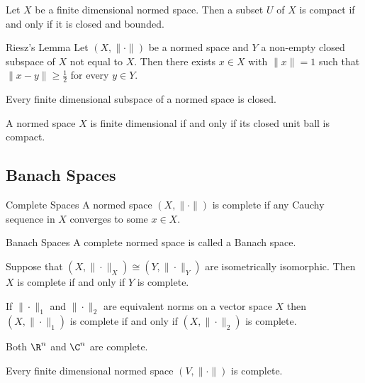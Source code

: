 \documentclass[a4paper]{article}
\begin{document}
\begin{thm}{}{} Let $X$ be a finite dimensional normed space. Then a subset $U$ of $X$ is compact if and only if it is closed and bounded. 
\end{thm}

\begin{lmm}{Riesz's Lemma}{} Let $(X,\|\cdot\|)$ be a normed space and $Y$ a non-empty closed subspace of $X$ not equal to $X$. Then there exists $x\in X$ with $\|x\|=1$ such that $\|x-y\|\geq \frac{1}{2}$ for every $y\in Y$. 
\end{lmm}

\begin{prp}{}{} Every finite dimensional subspace of a normed space is closed. 
\end{prp}

\begin{thm}{}{} A normed space $X$ is finite dimensional if and only if its closed unit ball is compact. 
\end{thm}

\subsection{Banach Spaces}
\begin{defn}{Complete Spaces}{} A normed space $(X,\|\cdot\|)$ is complete if any Cauchy sequence in $X$ converges to some $x\in X$. 
\end{defn}

\begin{defn}{Banach Spaces}{} A complete normed space is called a Banach space.
\end{defn}

\begin{lmm}{}{} Suppose that $(X,\|\cdot\|_X)\cong(Y,\|\cdot\|_Y)$ are isometrically isomorphic. Then $X$ is complete if and only if $Y$ is complete. 
\end{lmm}

\begin{lmm}{}{} If $\|\cdot\|_1$ and $\|\cdot\|_2$ are equivalent norms on a vector space $X$ then $(X,\|\cdot\|_1)$ is complete if and only if $(X,\|\cdot\|_2)$ is complete. 
\end{lmm}

\begin{prp}{}{} Both $\R^n$ and $\C^n$ are complete. 
\end{prp}

\begin{crl}{}{} Every finite dimensional normed space $(V,\|\cdot\|)$ is complete. 
\end{crl}
\end{document}
